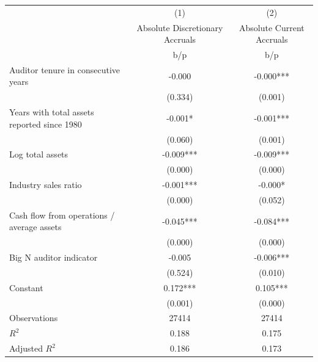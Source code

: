 {
\def\sym#1{\ifmmode^{#1}\else\(^{#1}\)\fi}
\begin{tabular}{l*{2}{c}}
\hline\hline
                    &\multicolumn{1}{c}{(1)}&\multicolumn{1}{c}{(2)}\\
                    &\multicolumn{1}{c}{Absolute Discretionary Accruals}&\multicolumn{1}{c}{Absolute Current Accruals}\\
                    &         b/p   &         b/p   \\
\hline
Auditor tenure in consecutive years&      -0.000   &      -0.000***\\
                    &     (0.334)   &     (0.001)   \\
Years with total assets reported since 1980&      -0.001*  &      -0.001***\\
                    &     (0.060)   &     (0.001)   \\
Log total assets    &      -0.009***&      -0.009***\\
                    &     (0.000)   &     (0.000)   \\
Industry sales ratio&      -0.001***&      -0.000*  \\
                    &     (0.000)   &     (0.052)   \\
Cash flow from operations / average assets&      -0.045***&      -0.084***\\
                    &     (0.000)   &     (0.000)   \\
Big N auditor indicator&      -0.005   &      -0.006***\\
                    &     (0.524)   &     (0.010)   \\
Constant            &       0.172***&       0.105***\\
                    &     (0.001)   &     (0.000)   \\
\hline
Observations        &       27414   &       27414   \\
\(R^{2}\)           &       0.188   &       0.175   \\
Adjusted \(R^{2}\)  &       0.186   &       0.173   \\
\hline\hline
\end{tabular}
}
